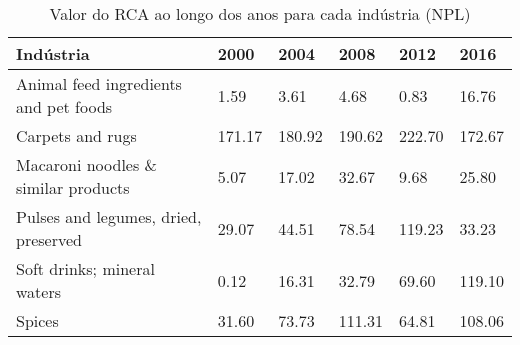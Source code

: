\begin{table}
\centering
\caption{Valor do RCA ao longo dos anos para cada indústria (NPL)}
\begin{tabular}{p{6cm}p{1.5cm}p{1.5cm}p{1.5cm}p{1.5cm}p{1.5cm}}
\toprule
                            Indústria &   2000 &   2004 &   2008 &   2012 &   2016 \\
\midrule
Animal feed ingredients and pet foods &   1.59 &   3.61 &   4.68 &   0.83 &  16.76 \\
                     Carpets and rugs & 171.17 & 180.92 & 190.62 & 222.70 & 172.67 \\
  Macaroni noodles \& similar products &   5.07 &  17.02 &  32.67 &   9.68 &  25.80 \\
 Pulses and legumes, dried, preserved &  29.07 &  44.51 &  78.54 & 119.23 &  33.23 \\
          Soft drinks; mineral waters &   0.12 &  16.31 &  32.79 &  69.60 & 119.10 \\
                               Spices &  31.60 &  73.73 & 111.31 &  64.81 & 108.06 \\
\bottomrule
\end{tabular}
\end{table}
